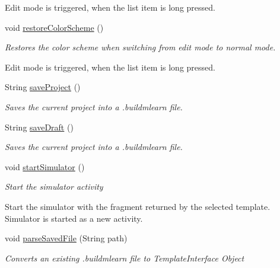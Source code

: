 \begin{DoxyCompactItemize}
\begin{DoxyCompactList}
Edit mode is triggered, when the list item is long pressed. \end{DoxyCompactList}\item 
void \hyperlink{classorg_1_1buildmlearn_1_1toolkit_1_1activity_1_1TemplateEditor_a596abe1f201578b28de1e3491b4f8cd6}{restore\+Color\+Scheme} ()
\begin{DoxyCompactList}\small\item\em Restores the color scheme when switching from edit mode to normal mode. 

Edit mode is triggered, when the list item is long pressed. \end{DoxyCompactList}\item 
String \hyperlink{classorg_1_1buildmlearn_1_1toolkit_1_1activity_1_1TemplateEditor_aaec7f80eb29a74505a25bed11c20c29d}{save\+Project} ()
\begin{DoxyCompactList}\small\item\em Saves the current project into a .buildmlearn file. \end{DoxyCompactList}\item 
String \hyperlink{classorg_1_1buildmlearn_1_1toolkit_1_1activity_1_1TemplateEditor_a65923747a2021fb9952cb9690ce78cb1}{save\+Draft} ()
\begin{DoxyCompactList}\small\item\em Saves the current project into a .buildmlearn file. \end{DoxyCompactList}\item 
void \hyperlink{classorg_1_1buildmlearn_1_1toolkit_1_1activity_1_1TemplateEditor_a0f4842fdb6b28f218c6f2ac5c69e62e1}{start\+Simulator} ()
\begin{DoxyCompactList}\small\item\em Start the simulator activity 

Start the simulator with the fragment returned by the selected template. Simulator is started as a new activity. \end{DoxyCompactList}\item 
void \hyperlink{classorg_1_1buildmlearn_1_1toolkit_1_1activity_1_1TemplateEditor_aef3001b6ab6df927e92ada78c02bc7da}{parse\+Saved\+File} (String path)
\begin{DoxyCompactList}\small\item\em Converts an existing .buildmlearn file to Template\+Interface Object 


\end{DoxyCompactList}
\end{DoxyCompactItemize}
